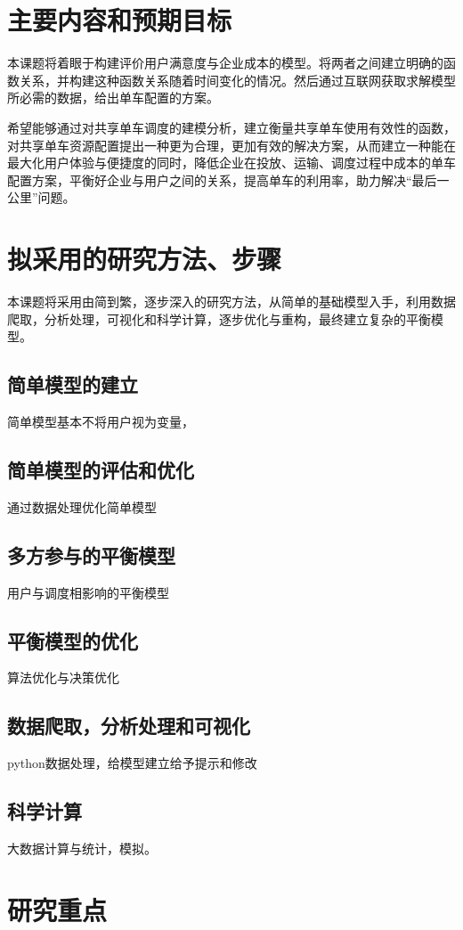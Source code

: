 \documentclass [16pt,cn,a4paper,bibtex]{elegantpaper}
\begin{document}
\section{主要内容和预期目标}

本课题将着眼于构建评价用户满意度与企业成本的模型。将两者之间建立明确的函数关系，并构建这种函数关系随着时间变化的情况。然后通过互联网获取求解模型所必需的数据，给出单车配置的方案。

希望能够通过对共享单车调度的建模分析，建立衡量共享单车使用有效性的函数，对共享单车资源配置提出一种更为合理，更加有效的解决方案，从而建立一种能在最大化用户体验与便捷度的同时，降低企业在投放、运输、调度过程中成本的单车配置方案，平衡好企业与用户之间的关系，提高单车的利用率，助力解决“最后一公里”问题。

\section{拟采用的研究方法、步骤}
    本课题将采用由简到繁，逐步深入的研究方法，从简单的基础模型入手，利用数据爬取，分析处理，可视化和科学计算，逐步优化与重构，最终建立复杂的平衡模型。
\subsection{简单模型的建立}
简单模型基本不将用户视为变量，
\subsection{简单模型的评估和优化}
通过数据处理优化简单模型
\subsection{多方参与的平衡模型}
用户与调度相影响的平衡模型
\subsection{平衡模型的优化}
算法优化与决策优化
\subsection{数据爬取，分析处理和可视化}
python数据处理，给模型建立给予提示和修改
\subsection{科学计算}
大数据计算与统计，模拟。

\section{研究重点}
\end{document}
